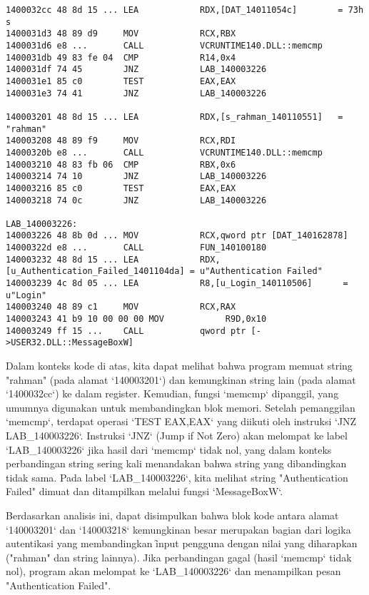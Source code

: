 \begin{verbatim}
1400032cc 48 8d 15 ... LEA            RDX,[DAT_14011054c]        = 73h  s
1400031d3 48 89 d9     MOV            RCX,RBX
1400031d6 e8 ...       CALL           VCRUNTIME140.DLL::memcmp
1400031db 49 83 fe 04  CMP            R14,0x4
1400031df 74 45        JNZ            LAB_140003226
1400031e1 85 c0        TEST           EAX,EAX
1400031e3 74 41        JNZ            LAB_140003226

140003201 48 8d 15 ... LEA            RDX,[s_rahman_140110551]   = "rahman"
140003208 48 89 f9     MOV            RCX,RDI
14000320b e8 ...       CALL           VCRUNTIME140.DLL::memcmp
140003210 48 83 fb 06  CMP            RBX,0x6
140003214 74 10        JNZ            LAB_140003226
140003216 85 c0        TEST           EAX,EAX
140003218 74 0c        JNZ            LAB_140003226

LAB_140003226:
140003226 48 8b 0d ... MOV            RCX,qword ptr [DAT_140162878]
14000322d e8 ...       CALL           FUN_140100180
140003232 48 8d 15 ... LEA            RDX,[u_Authentication_Failed_1401104da] = u"Authentication Failed"
140003239 4c 8d 05 ... LEA            R8,[u_Login_140110506]      = u"Login"
140003240 48 89 c1     MOV            RCX,RAX
140003243 41 b9 10 00 00 00 MOV            R9D,0x10
140003249 ff 15 ...    CALL           qword ptr [->USER32.DLL::MessageBoxW]
\end{verbatim}

Dalam konteks kode di atas, kita dapat melihat bahwa program memuat string "rahman" (pada alamat `140003201`) dan kemungkinan string lain (pada alamat `1400032cc`) ke dalam register. Kemudian, fungsi `memcmp` dipanggil, yang umumnya digunakan untuk membandingkan blok memori. Setelah pemanggilan `memcmp`, terdapat operasi `TEST EAX,EAX` yang diikuti oleh instruksi `JNZ LAB\_140003226`. Instruksi `JNZ` (Jump if Not Zero) akan melompat ke label `LAB\_140003226` jika hasil dari `memcmp` tidak nol, yang dalam konteks perbandingan string sering kali menandakan bahwa string yang dibandingkan tidak sama. Pada label `LAB\_140003226`, kita melihat string "Authentication Failed" dimuat dan ditampilkan melalui fungsi `MessageBoxW`.

Berdasarkan analisis ini, dapat disimpulkan bahwa blok kode antara alamat `140003201` dan `140003218` kemungkinan besar merupakan bagian dari logika autentikasi yang membandingkan \f{input} pengguna dengan nilai yang diharapkan ("rahman" dan string lainnya). Jika perbandingan gagal (hasil `memcmp` tidak nol), program akan melompat ke `LAB\_140003226` dan menampilkan pesan "Authentication Failed".

